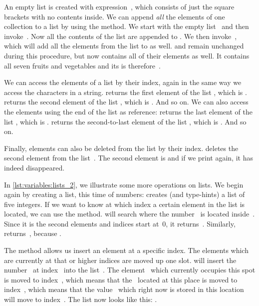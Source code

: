 An empty list is created with expression~\pythonilIdx{[]}, which consists of just the square brackets with no contents inside.
We can append \emph{all} the elements of one collection to a list by using the  method.
We start with the empty list~ and then invoke~.
Now all the contents of the list  are appended to .
We then invoke~, which will add all the elements from the list  to  as well.
 and  remain unchanged during this procedure, but  now contains all of their elements as well.
It contains all seven fruits and vegetables and its  is therefore~.

We can access the elements of a list by their index, again in the same way we access the characters in a string.
 returns the first element of the list , which is .
 returns the second element of the list , which is .
And so on.
We can also access the elements using the end of the list as reference:
 returns the last element of the list , which is .
 returns the second-to-last element of the list , which is .
And so on.

Finally, elements can also be deleted from the list by their index.
 deletes the second element from the list~.
The second element is  and if we print  again, it has indeed disappeared.

In \cref{lst:variables:lists_2}, we illustrate some more operations on lists.
We begin again by creating a list, this time of numbers:  creates (and type-hints) a list of five integers.
If we want to know at which index a certain element in the list is located, we can use the  method.
 will search where the number~ is located inside~.
Since it is the second elements and indices start at~0, it returns~.
Similarly,  returns~, because .

The  method allows us insert an element at a specific index.
The elements which are currently at that or higher indices are moved up one slot.
 will insert the number~ at index~ into the list~.
The element~ which currently occupies this spot is moved to index~, which means that the~ located at this place is moved to index~, which means that the value~ which right now is stored in this location will move to index~.
The list  now looks like this: \pythonil{[1, 7, 12, 56, 2, 4]}.

